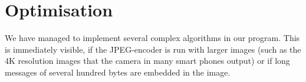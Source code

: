 \section{Optimisation}
We have managed to implement several complex algorithms in our program. This is immediately visible, if the JPEG-encoder is run with larger images (such as the 4K resolution images that the camera in many smart phones output) or if long messages of several hundred bytes are embedded in the image.

